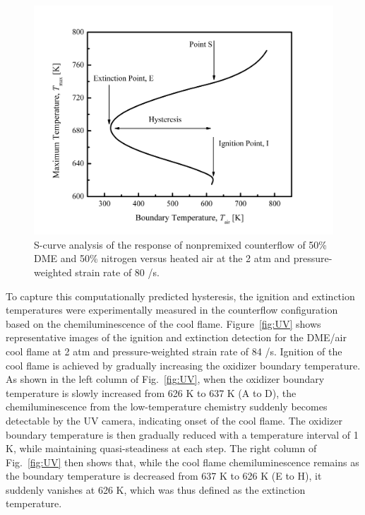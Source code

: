 \begin{figure}[t]
  \centering
  \scriptsize
  \includegraphics[width=1.0\textwidth]{ch-NTC/S-Curve.png}
  \normalsize
  \caption{S-curve analysis of the response of nonpremixed counterflow of 50\% DME and 50\% nitrogen versus heated air at the 2 atm and pressure-weighted strain rate of 80 /s.}
  \label{fig:Scurve-hys}
\end{figure}

To capture this computationally predicted hysteresis, the ignition and extinction temperatures were experimentally measured in the counterflow configuration based on the chemiluminescence of the cool flame.  Figure~\ref{fig:UV} shows representative images of the ignition and extinction detection for the DME/air cool flame at 2 atm and pressure-weighted strain rate of 84 /s.  Ignition of the cool flame is achieved by gradually increasing the oxidizer boundary temperature.  As shown in the left column of Fig.~\ref{fig:UV}, when the oxidizer boundary temperature is slowly increased from 626 K to 637 K (A to D), the chemiluminescence from the low-temperature chemistry suddenly becomes detectable by the UV camera, indicating onset of the cool flame.  The oxidizer boundary temperature is then gradually reduced with a temperature interval of 1 K, while maintaining quasi-steadiness at each step.  The right column of Fig.~\ref{fig:UV} then shows that, while the cool flame chemiluminescence remains as the boundary temperature is decreased from 637 K to 626 K (E to H), it suddenly vanishes at 626 K, which was thus defined as the extinction temperature.

